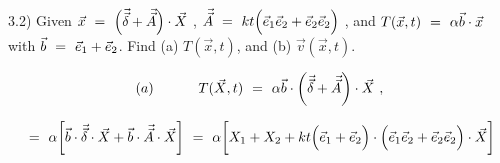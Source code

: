 \documentclass{article}
\begin{document}
3.2) Given \begin{math} \vec{x} \hspace{0.125cm} = \hspace{0.125cm} \Big( \vec{\vec{\delta}} + \vec{\vec{A}} \Big) \cdot \vec{X} \end{math} ,  \begin{math} \vec{\vec{A}} \hspace{0.125cm} = \hspace{0.125cm} k t \Big( \vec{e}_1 \vec{e}_2 + \vec{e}_2 \vec{e}_2 \Big) \end{math} , and  \begin{math} T( \vec{x} , t ) \hspace{0.125cm} = \hspace{0.125cm} \alpha \vec{b} \cdot \vec{x} \end{math} with \begin{math} \vec{b} \hspace{0.125cm} = \hspace{0.125cm} \vec{e}_1 + \vec{e}_2 \end{math}. Find (a) \begin{math} T( \vec{x} , t ) \end{math}, and (b) \begin{math} \vec{v}( \vec{x} , t ) \end{math}.

\begin{equation} \label{eb-eq-1-9}
(a) \hspace{1.125cm} T( \vec{X} , t ) \hspace{0.125cm} = \hspace{0.125cm} \alpha \vec{b} \cdot \bigg( \vec{\vec{\delta}} + \vec{\vec{A}} \bigg) \cdot \vec{X} \hspace{0.125cm} , 
\end{equation}

\begin{equation} \label{eb-eq-1-10}
\hspace{0.125cm} = \hspace{0.125cm} \alpha \bigg[ \vec{b} \cdot \vec{\vec{\delta}} \cdot \vec{X} + \vec{b} \cdot \vec{\vec{A}} \cdot \vec{X} \bigg] \hspace{0.125cm} =  \hspace{0.125cm} \alpha \bigg[ X_1 + X_2 + k t \Big( \vec{e}_1 + \vec{e}_2 \Big)  \cdot \Big( \vec{e}_1 \vec{e}_2 + \vec{e}_2 \vec{e}_2 \Big) \cdot \vec{X} \bigg]
\end{equation}
\end{document}
